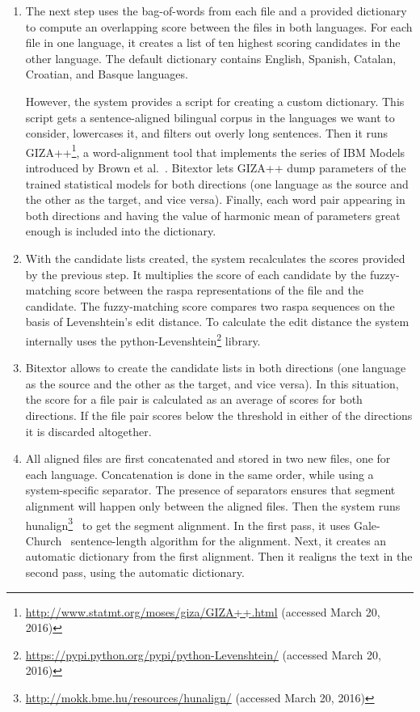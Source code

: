 \begin{enumerate}
	\item The next step uses the bag-of-words from each file and a provided dictionary to compute an overlapping score between the files in both languages. For each file in one language, it creates a list of ten highest scoring candidates in the other language. The default dictionary contains English, Spanish, Catalan, Croatian, and Basque languages.
	
	However, the system provides a script for creating a custom dictionary. This script gets a sentence-aligned bilingual corpus in the languages we want to consider, lowercases it, and filters out overly long sentences. Then it runs GIZA++\footnote{\url{http://www.statmt.org/moses/giza/GIZA++.html} (accessed March 20, 2016)}, a word-alignment tool that implements the series of IBM Models introduced by Brown et al.~\cite{Brown93}. Bitextor lets GIZA++ dump parameters of the trained statistical models for both directions (one language as the source and the other as the target, and vice versa). Finally, each word pair appearing in both directions and having the value of harmonic mean of parameters great enough is included into the dictionary.
	
	\item With the candidate lists created, the system recalculates the scores provided by the previous step. It multiplies the score of each candidate by the fuzzy-matching score between the raspa representations of the file and the candidate. The fuzzy-matching score compares two raspa sequences on the basis of Levenshtein's edit distance. To calculate the edit distance the system internally uses the python-Levenshtein\footnote{\url{https://pypi.python.org/pypi/python-Levenshtein/} (accessed March 20, 2016)} library.
	
	\item Bitextor allows to create the candidate lists in both directions (one language as the source and the other as the target, and vice versa). In this situation, the score for a file pair is calculated as an average of scores for both directions. If the file pair scores below the threshold in either of the directions it is discarded altogether.
	
	\item All aligned files are first concatenated and stored in two new files, one for each language. Concatenation is done in the same order, while using a system-specific separator. The presence of separators ensures that segment alignment will happen only between the aligned files. Then the system runs hunalign\footnote{\url{http://mokk.bme.hu/resources/hunalign/} (accessed March 20, 2016)}~\cite{Varga05} to get the segment alignment. In the first pass, it uses Gale-Church~\cite{Gale93} sentence-length algorithm for the alignment. Next, it creates an automatic dictionary from the first alignment. Then it realigns the text in the second pass, using the automatic dictionary.
	

\end{enumerate}
